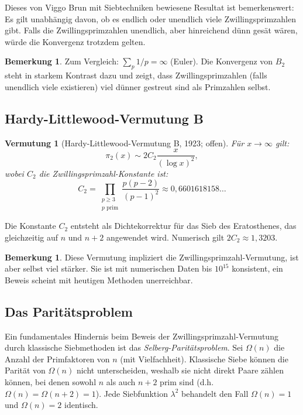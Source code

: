 \documentclass[12pt,a4paper]{amsart}
\newtheorem{vermutung}[theorem]{Vermutung}
\theoremstyle{definition}
\newtheorem{bemerkung}[theorem]{Bemerkung}
\begin{document}
Dieses von Viggo Brun mit Siebtechniken bewiesene Resultat ist bemerkenswert:
Es gilt unabh\"{a}ngig davon, ob es endlich oder unendlich viele Zwillingsprimzahlen
gibt. Falls die Zwillingsprimzahlen unendlich, aber hinreichend d\"{u}nn ges\"{a}t
w\"{a}ren, w\"{u}rde die Konvergenz trotzdem gelten.

\begin{bemerkung}
Zum Vergleich: $\sum_p 1/p = \infty$ (Euler). Die Konvergenz von $B_2$ steht
in starkem Kontrast dazu und zeigt, dass Zwillingsprimzahlen (falls unendlich
viele existieren) viel d\"{u}nner gestreut sind als Primzahlen selbst.
\end{bemerkung}

\subsection{Hardy-Littlewood-Vermutung B}

\begin{vermutung}[Hardy-Littlewood-Vermutung B, 1923; offen]
\label{verm:hl}
F\"{u}r $x \to \infty$ gilt:
\[
  \pi_2(x) \sim 2 C_2 \frac{x}{(\log x)^2},
\]
wobei $C_2$ die \emph{Zwillingsprimzahl-Konstante} ist:
\[
  C_2 = \prod_{\substack{p \geq 3 \\ p \text{ prim}}} \frac{p(p-2)}{(p-1)^2}
       \approx 0{,}6601618158\ldots
\]
\end{vermutung}

Die Konstante $C_2$ entsteht als Dichtekorrektur f\"{u}r das Sieb des Eratosthenes,
das gleichzeitig auf $n$ und $n+2$ angewendet wird. Numerisch gilt
$2C_2 \approx 1{,}3203$.

\begin{bemerkung}
Diese Vermutung impliziert die Zwillingsprimzahl-Vermutung, ist aber selbst viel
st\"{a}rker. Sie ist mit numerischen Daten bis $10^{15}$ konsistent, ein Beweis
scheint mit heutigen Methoden unerreichbar.
\end{bemerkung}

\subsection{Das Parit\"{a}tsproblem}

Ein fundamentales Hindernis beim Beweis der Zwillingsprimzahl-Vermutung durch
klassische Siebmethoden ist das \emph{Selberg-Parit\"{a}tsproblem}. Sei
$\Omega(n)$ die Anzahl der Primfaktoren von $n$ (mit Vielfachheit). Klassische
Siebe k\"{o}nnen die Parit\"{a}t von $\Omega(n)$ nicht unterscheiden, weshalb sie
nicht direkt Paare z\"{a}hlen k\"{o}nnen, bei denen sowohl $n$ als auch $n+2$ prim
sind (d.h.\ $\Omega(n) = \Omega(n+2) = 1$). Jede Siebfunktion $\lambda^2$
behandelt den Fall $\Omega(n) = 1$ und $\Omega(n) = 2$ identisch.
\end{document}
